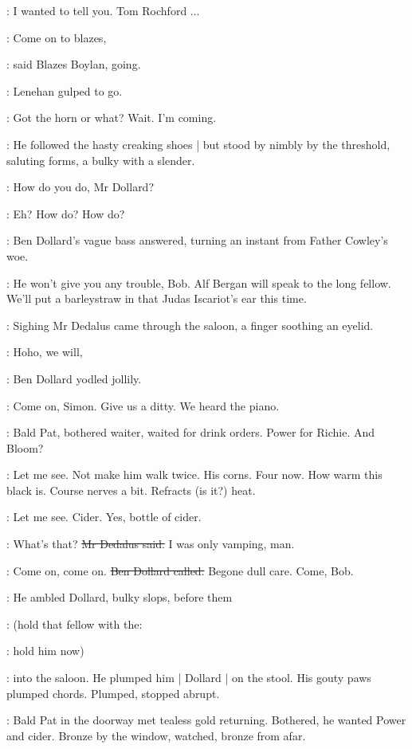 \lenehan:
I wanted to tell you.
Tom Rochford ...

\boylan:
Come on to blazes,

:
said Blazes Boylan, going.

:
Lenehan gulped to go.

\lenehan:
Got the horn or what?
Wait.
I'm coming.

:
He followed the hasty creaking shoes |
but stood by nimbly by the threshold,
saluting forms,
a bulky with a slender.

\lenehan:
How do you do, Mr Dollard?

\dollard:
Eh?
How do?
How do?

:
Ben Dollard's vague bass answered,
turning an instant from Father Cowley's woe.

\dollard:
He won't give you any trouble, Bob.
Alf Bergan will speak to the long fellow.
We'll put a barleystraw in that Judas Iscariot's ear this time.

:
Sighing Mr Dedalus came through the saloon,
a finger soothing an eyelid.

\dollard:
Hoho, we will,

:
Ben Dollard yodled jollily.

\dollard:
Come on, Simon.
Give us a ditty.
We heard the piano.

:
Bald Pat, bothered waiter, waited for drink orders.
Power for Richie.
And Bloom?

\BloomInt:
Let me see.
Not make him walk twice.
His corns.
Four now.
How warm this black is.
Course nerves a bit.
Refracts (is it?) heat.

\Bloom:
Let me see.
Cider.
Yes, bottle of cider.

\simon:
What's that?
\sout{Mr Dedalus said.}
I was only vamping, man.

\dollard:
Come on, come on.
\sout{Ben Dollard called.}
Begone dull care.
Come, Bob.

:
He ambled Dollard, bulky slops, before them

\simon:
(hold that fellow with the:

\dollard:
hold him now)

:
into the saloon.
He plumped him |
Dollard |
on the stool.
His gouty paws plumped chords.
Plumped, stopped abrupt.

:
Bald Pat in the doorway met tealess gold returning.
Bothered, he wanted Power and cider.
Bronze by the window, watched,
bronze from afar.

